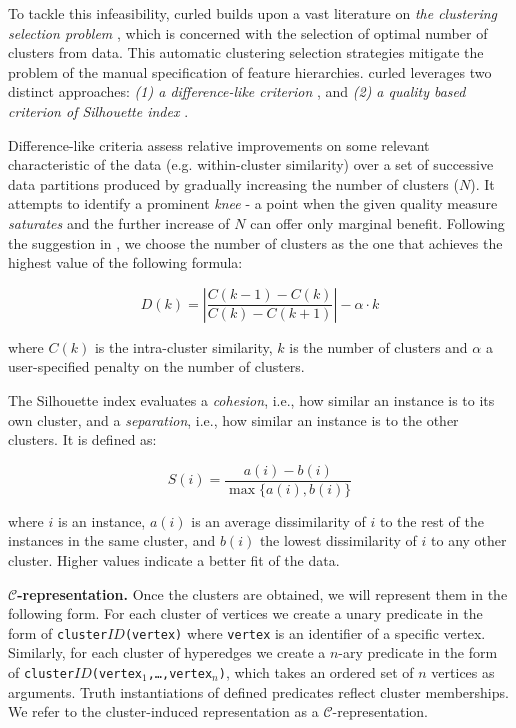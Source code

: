 To tackle this infeasibility, \gls{curled} builds upon a vast literature on \textit{the clustering selection problem} \cite{Arbelaitz:2013}, which is concerned with the selection of optimal number of clusters from data.
This automatic clustering selection strategies mitigate the problem of the manual specification of feature hierarchies.
\gls{curled} leverages  two distinct approaches: \textit{(1) a difference-like criterion} \cite{Vendramin:2010}, and \textit{(2) a quality based criterion of Silhouette index} \cite{Rousseeuw:1987}.


Difference-like criteria assess relative improvements on some relevant characteristic of the data (e.g. within-cluster similarity) over a set of successive data partitions produced by gradually increasing the number of clusters ($N$).
It attempts to identify a prominent \textit{knee} - a point when the given quality measure \textit{saturates} and the further increase of $N$ can offer only marginal benefit.
Following the suggestion in \cite{Vendramin:2010}, we choose the number of clusters as the one that achieves the highest value of the following formula:

\begin{equation}
	D(k) = \left| \frac{C(k-1) - C(k)}{C(k) - C(k+1)} \right| - \alpha \cdot k
	\label{eq:Sat}
\end{equation}

where $C(k)$ is the intra-cluster similarity, $k$ is the number of clusters and $\alpha$ a user-specified penalty on the number of clusters.


The Silhouette index evaluates a \textit{cohesion}, i.e., how similar an instance is to its own cluster, and a \textit{separation}, i.e., how similar an instance is to the other clusters.
It is defined as:

\begin{equation}
    S(i) = \frac{a(i) - b(i)}{ \max \{ a(i), b(i)\}}
\end{equation}

where $i$ is an instance, $a(i)$ is an average dissimilarity of $i$ to the rest of the instances in the same cluster, and $b(i)$ the lowest dissimilarity of $i$ to any other cluster. 
Higher values indicate a better fit of the data.


\textbf{$\mathcal{C}$-representation.} 
Once the clusters are obtained, we will represent them in the following form.
For each cluster of vertices we create a unary predicate in the form of \texttt{cluster$ID$(vertex)} where {\tt vertex} is an identifier of a specific vertex.
Similarly, for each cluster of hyperedges we create a $n$-ary predicate in the form of \texttt{cluster$ID$(vertex$_1$,\ldots,vertex$_n$)}, which takes an ordered set of $n$ vertices as arguments.
Truth instantiations of defined predicates reflect cluster memberships.
We refer to the cluster-induced representation as a $\mathcal{C}$-representation.


